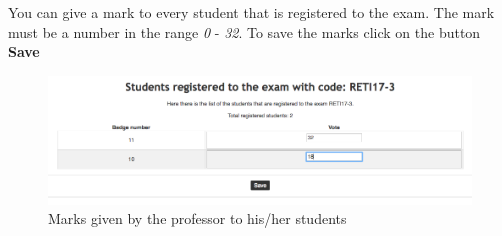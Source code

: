 You can give a mark to every student that is registered to the exam. The mark must be a number in the range \emph{0} - \emph{32}. To save the marks click on the button \textbf{Save}

\begin{figure}[H]
	\centering
	\includegraphics[width=1.0\textwidth]{img/professorExamsMarks.png}
	\caption{Marks given by the professor to his/her students}
	\label{fig:professorExamsMarks}
\end{figure}
